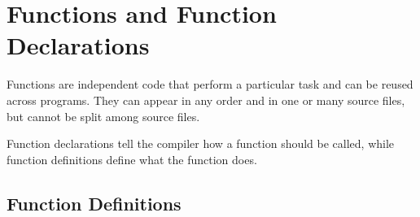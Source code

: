 \section{Functions and Function Declarations}

Functions are independent code that perform a particular task and can be reused across programs. They can appear in any order and in one or many source files, but cannot be split among source files.

Function declarations tell the compiler how a function should be called, while function definitions define what the function does. 

\subsection{Function Definitions}\label{ssec:Function Definitions}
